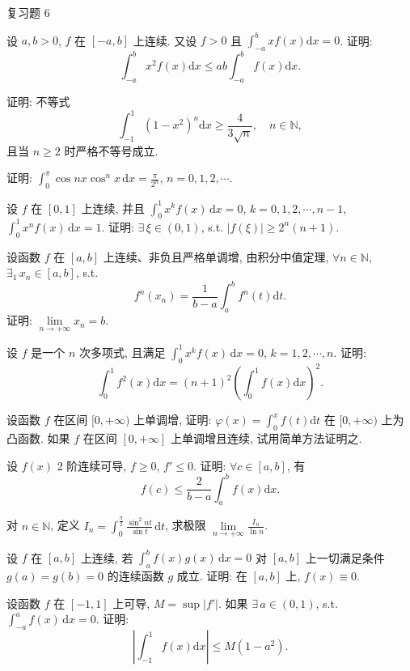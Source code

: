 \begin{exblock}{复习题 6}
\item 设 $a,b>0$, $f$ 在 $[-a,b]$ 上连续. 又设 $f>0$ 且 $\int_{-a}^{b}xf(x)\mathrm{d}x=0$. 证明:
\[
\int_{-a}^{b}x^{2}f(x)\mathrm{d}x\leqslant ab\int_{-a}^{b}f(x)\mathrm{d}x.
\]

\item 证明: 不等式
\[
\int_{-1}^{1}(1-x^{2})^{n}\mathrm{d}x\geqslant\frac{4}{3\sqrt{n}},\quad n\in\mathbb{N},
\]
且当 $n\geqslant 2$ 时严格不等号成立.

\item 证明: $\int_{0}^{\pi}\cos nx\cos^{n}x\,\mathrm{d}x=\frac{\pi}{2^{n}}$, $n=0,1,2,\cdots$.

\item 设 $f$ 在 $[0,1]$ 上连续, 并且 $\int_{0}^{1}x^{k}f(x)\,\mathrm{d}x=0$, $k=0,1,2,\cdots,n-1$, $\int_{0}^{1}x^{n}f(x)\,\mathrm{d}x=1$. 证明: $\exists\,\xi\in(0,1)$, s.t. $|f(\xi)|\geqslant 2^{n}(n+1)$.

\item 设函数 $f$ 在 $[a,b]$ 上连续、非负且严格单调增, 由积分中值定理, $\forall n\in\mathbb{N}$, $\exists_{1}\,x_{n}\in[a,b]$, s.t.
\[
f^{n}(x_{n})=\frac{1}{b-a}\int_{a}^{b}f^{n}(t)\mathrm{d}t.
\]
证明: $\lim\limits_{n\to+\infty}x_{n}=b$.

\item 设 $f$ 是一个 $n$ 次多项式, 且满足 $\int_{0}^{1}x^{k}f(x)\,\mathrm{d}x=0$, $k=1,2,\cdots,n$. 证明:
\[
\int_{0}^{1}f^{2}(x)\mathrm{d}x=(n+1)^{2}\left(\int_{0}^{1}f(x)\mathrm{d}x\right)^{2}.
\]

\item 设函数 $f$ 在区间 $[0,+\infty)$ 上单调增, 证明: $\varphi(x)=\int_{0}^{x}f(t)\mathrm{d}t$ 在 $[0,+\infty)$ 上为凸函数. 如果 $f$ 在区间 $[0,+\infty]$ 上单调增且连续, 试用简单方法证明之.

\item 设 $f(x)$ 2 阶连续可导, $f\geqslant 0$, $f'\leqslant 0$. 证明: $\forall c\in[a,b]$, 有
\[
f(c)\leqslant\frac{2}{b-a}\int_{a}^{b}f(x)\mathrm{d}x.
\]

\item 对 $n\in\mathbb{N}$, 定义 $I_{n}=\int_{0}^{\frac{\pi}{2}}\frac{\sin^{2}nt}{\sin t}\,\mathrm{d}t$, 求极限 $\lim\limits_{n\to+\infty}\frac{I_{n}}{\ln n}$.

\item 设 $f$ 在 $[a,b]$ 上连续, 若 $\int_{a}^{b}f(x)g(x)\,\mathrm{d}x=0$ 对 $[a,b]$ 上一切满足条件 $g(a)=g(b)=0$ 的连续函数 $g$ 成立. 证明: 在 $[a,b]$ 上, $f(x)\equiv 0$.

\item 设函数 $f$ 在 $[-1,1]$ 上可导, $M=\sup|f'|$. 如果 $\exists\,a\in(0,1)$, s.t. $\int_{-a}^{a}f(x)\,\mathrm{d}x=0$. 证明:
\[
\left|\int_{-1}^{1}f(x)\mathrm{d}x\right|\leqslant M(1-a^{2}).
\]


\end{exblock}
